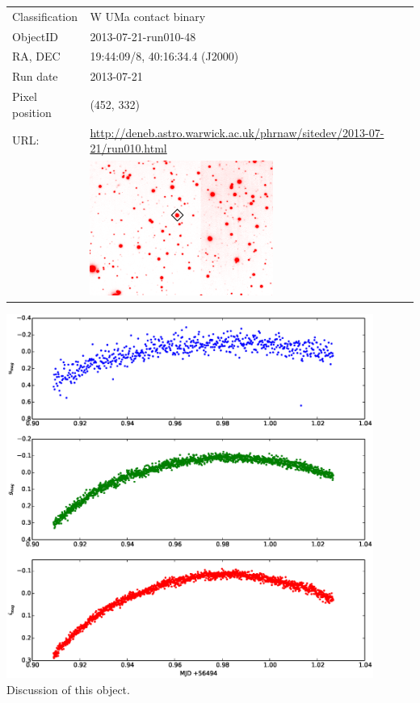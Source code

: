   \begin{tabular}{l l}
  Classification & {W UMa} contact binary \\
  ObjectID & 2013-07-21-run010-48 \\
  RA, DEC & 19:44:09/8, 40:16:34.4 (J2000) \\
  Run date & 2013-07-21 \\
  Pixel position & (452, 332) \\
  URL: & \small \url{http://deneb.astro.warwick.ac.uk/phrnaw/sitedev/2013-07-21/run010.html} \\
       & \includegraphics[width=60mm]{images/2013-07-21-run010-48.png} \\
  \end{tabular}
  \includegraphics[width=120mm]{images/2013-07-21-run010-48_lightcurve.eps} \\
  Discussion of this object.

